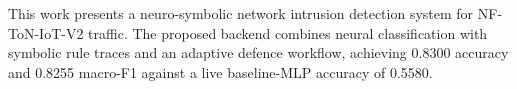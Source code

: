 This work presents a neuro-symbolic network intrusion detection system for NF-ToN-IoT-V2 traffic. The proposed backend combines neural classification with symbolic rule traces and an adaptive defence workflow, achieving 0.8300 accuracy and 0.8255 macro-F1 against a live baseline-MLP accuracy of 0.5580.